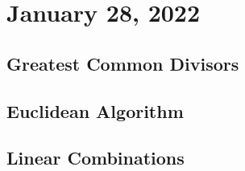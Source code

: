 \section{January 28, 2022}
\subsection{Greatest Common Divisors}

\subsection{Euclidean Algorithm}

\subsection{Linear Combinations}
